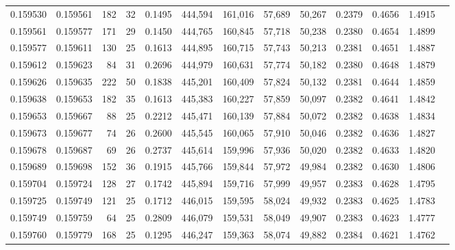 \begin{tabular}{rrrrrrrrrrrrr}
0.159530 & 0.159561 &   182 &  32 &                                     0.1495 & 444,594 & 161,016 &  57,689 &  50,267 & 0.2379 & 0.4656 & 1.4915 \\
0.159561 & 0.159577 &   171 &  29 &                                     0.1450 & 444,765 & 160,845 &  57,718 &  50,238 & 0.2380 & 0.4654 & 1.4899 \\
0.159577 & 0.159611 &   130 &  25 &                                     0.1613 & 444,895 & 160,715 &  57,743 &  50,213 & 0.2381 & 0.4651 & 1.4887 \\
0.159612 & 0.159623 &    84 &  31 &                                     0.2696 & 444,979 & 160,631 &  57,774 &  50,182 & 0.2380 & 0.4648 & 1.4879 \\
0.159626 & 0.159635 &   222 &  50 &                                     0.1838 & 445,201 & 160,409 &  57,824 &  50,132 & 0.2381 & 0.4644 & 1.4859 \\
0.159638 & 0.159653 &   182 &  35 &                                     0.1613 & 445,383 & 160,227 &  57,859 &  50,097 & 0.2382 & 0.4641 & 1.4842 \\
0.159653 & 0.159667 &    88 &  25 &                                     0.2212 & 445,471 & 160,139 &  57,884 &  50,072 & 0.2382 & 0.4638 & 1.4834 \\
0.159673 & 0.159677 &    74 &  26 &                                     0.2600 & 445,545 & 160,065 &  57,910 &  50,046 & 0.2382 & 0.4636 & 1.4827 \\
0.159678 & 0.159687 &    69 &  26 &                                     0.2737 & 445,614 & 159,996 &  57,936 &  50,020 & 0.2382 & 0.4633 & 1.4820 \\
0.159689 & 0.159698 &   152 &  36 &                                     0.1915 & 445,766 & 159,844 &  57,972 &  49,984 & 0.2382 & 0.4630 & 1.4806 \\
0.159704 & 0.159724 &   128 &  27 &                                     0.1742 & 445,894 & 159,716 &  57,999 &  49,957 & 0.2383 & 0.4628 & 1.4795 \\
0.159725 & 0.159749 &   121 &  25 &                                     0.1712 & 446,015 & 159,595 &  58,024 &  49,932 & 0.2383 & 0.4625 & 1.4783 \\
0.159749 & 0.159759 &    64 &  25 &                                     0.2809 & 446,079 & 159,531 &  58,049 &  49,907 & 0.2383 & 0.4623 & 1.4777 \\
0.159760 & 0.159779 &   168 &  25 &                                     0.1295 & 446,247 & 159,363 &  58,074 &  49,882 & 0.2384 & 0.4621 & 1.4762 \\

\end{tabular}
